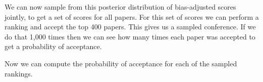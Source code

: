 \begin{flushright}
\end{flushright}

We can now sample from this posterior distribution of bias-adjusted
scores jointly, to get a set of scores for all papers. For this set of
scores we can perform a ranking and accept the top 400 papers. This
gives us a sampled conference. If we do that 1,000 times then we can see
how many times each paper was accepted to get a probability of
acceptance.

\begin{Shaded}
\begin{Highlighting}[]
\OperatorTok{=}  
\end{Highlighting}
\end{Shaded}

\begin{Shaded}
\begin{Highlighting}[]
\OperatorTok{=} 
\OperatorTok{=}\OperatorTok{=}\OperatorTok{=}\OperatorTok{=}
\OperatorTok{=}\OperatorTok{/}\NormalTok{(}\OperatorTok{=}
\end{Highlighting}
\end{Shaded}

Now we can compute the probability of acceptance for each of the sampled
rankings.

\begin{Shaded}
\begin{Highlighting}[]
\OperatorTok{=}\OperatorTok{\textgreater{}}\OperatorTok{{-}}\NormalTok{(}\OperatorTok{/}\NormalTok{paper\_score.shape[}\NormalTok{]))).}\NormalTok{(}\NormalTok{)}\OperatorTok{/}\NormalTok{)}
\OperatorTok{=} 
\end{Highlighting}
\end{Shaded}

